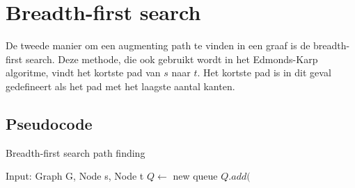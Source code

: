 \chapter{Breadth-first search}
\label{chap:breadthfirst}

De tweede manier om een augmenting path te vinden in een graaf is de breadth-first search. Deze methode, die ook gebruikt wordt in het Edmonds-Karp algoritme, vindt het kortste pad van $s$ naar $t$. Het kortste pad is in dit geval gedefineert als het pad met het laagste aantal kanten.

\section{Pseudocode}

\begin{algorithm}
 \caption{Breadth-first search path finding}
 \label{alg:breadthfirst}
 \begin{algorithmic}
  \REQUIRE Input: Graph G, Node s, Node t
  \STATE $Q \gets $ new queue
  \STATE $Q.add($
 \end{algorithmic}
\end{algorithm}

